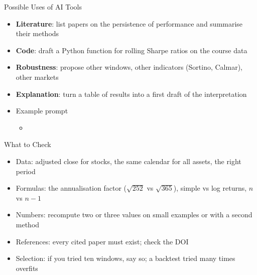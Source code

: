 \begin{frame}{Possible Uses of AI Tools}
\itemsize{\small}
\begin{itemize}
    \item \textbf{Literature}: list papers on the persistence of performance and summarise their methods
    \item \textbf{Code}: draft a Python function for rolling Sharpe ratios on the course data
    \item \textbf{Robustness}: propose other windows, other indicators (Sortino, Calmar), other markets
    \item \textbf{Explanation}: turn a table of results into a first draft of the interpretation
    \item Example prompt
    \begin{itemize}
        \item {}
    \end{itemize}
\end{itemize}
\end{frame}

\begin{frame}{What to Check}
\itemsize{\small}
\begin{itemize}
    \item Data: adjusted close for stocks, the same calendar for all assets, the right period
    \item Formulas: the annualisation factor ($\sqrt{252}$ vs $\sqrt{365}$), simple vs log returns, $n$ vs $n - 1$
    \item Numbers: recompute two or three values on small examples or with a second method
    \item References: every cited paper must exist; check the DOI
    \item Selection: if you tried ten windows, say so; a backtest tried many times overfits 
\end{itemize}
\end{frame}

